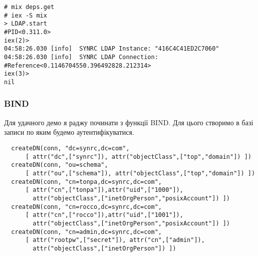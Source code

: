 \begin{lstlisting}
# mix deps.get
# iex -S mix
> LDAP.start
#PID<0.311.0>
iex(2)>
04:58:26.030 [info]  SYNRC LDAP Instance: "416C4C41ED2C7060"
04:58:26.030 [info]  SYNRC LDAP Connection: #Reference<0.1146704550.396492828.212314>
iex(3)>
nil
\end{lstlisting}

\newpage
\subsubsection{BIND}

Для удачного демо я раджу починати з функції BIND. Для цього створимо в базі записи по яким будемо аутентифікуватися.

\begin{lstlisting}
  createDN(conn, "dc=synrc,dc=com",
      [ attr("dc",["synrc"]), attr("objectClass",["top","domain"]) ])
  createDN(conn, "ou=schema",
      [ attr("ou",["schema"]), attr("objectClass",["top","domain"]) ])
  createDN(conn, "cn=tonpa,dc=synrc,dc=com",
      [ attr("cn",["tonpa"]),attr("uid",["1000"]),
        attr("objectClass",["inetOrgPerson","posixAccount"]) ])
  createDN(conn, "cn=rocco,dc=synrc,dc=com",
      [ attr("cn",["rocco"]),attr("uid",["1001"]),
        attr("objectClass",["inetOrgPerson","posixAccount"]) ])
  createDN(conn, "cn=admin,dc=synrc,dc=com",
      [ attr("rootpw",["secret"]), attr("cn",["admin"]),
        attr("objectClass",["inetOrgPerson"]) ])


\end{lstlisting}
